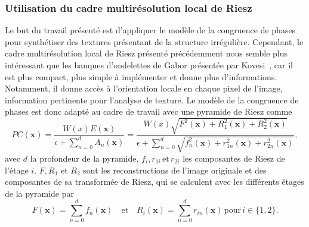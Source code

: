 \subsubsection{Utilisation du cadre multirésolution local de Riesz}

Le but du travail présenté est d'appliquer le modèle de la congruence de phases pour synthétiser des textures présentant de la structure irrégulière. Cependant, le cadre multirésolution local de Riesz présenté précédemment nous semble plus intéressant que les banques d'ondelettes de Gabor présentée par Kovesi~\cite{kovesi_image_1995}, car il est plus compact, plus simple à implémenter et donne plus d'informations. Notamment, il donne accès à l'orientation locale en chaque pixel de l'image, information pertinente pour l'analyse de texture. Le modèle de la congruence de phases est donc adapté au cadre de travail avec une pyramide de Riesz comme
\begin{equation}
    PC(\mathbf{x}) = \frac{W(x)E(\mathbf{x})}{\epsilon + \sum_{n=0}^{d} A_{n}(\mathbf{x})} = \frac{W(x)\sqrt{F^2(\mathbf{x})+R_1^2(\mathbf{x})+R_2^2(\mathbf{x})}}{\epsilon + \sum_{n=0}^{d} \sqrt{f_n^2(\mathbf{x}) + r_{1n}^2(\mathbf{x}) + r_{2n}^2(\mathbf{x})}},
\end{equation}
avec $d$ la profondeur de la pyramide, $f_i, r_{1i}\, \text{et}\, r_{2i}$ les composantes de Riesz de l'étage $i$. $F, R_1$ et $R_2$ sont les reconstructions de l'image originale et des composantes de sa transformée de Riesz, qui se calculent avec les différents étages de la pyramide par
\begin{equation}
    F(\mathbf{x}) = \sum_{n=0}^{d} f_n(\mathbf{x}) \quad \text{et} \quad R_i(\mathbf{x}) = \sum_{n=0}^{d} r_{in}(\mathbf{x})\, \text{pour}\, i \in \{1, 2\}.
\end{equation}

